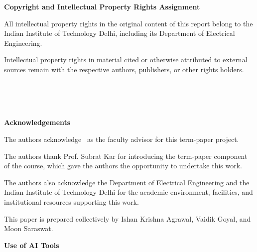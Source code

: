 \clearpage
\thispagestyle{ell305}
\vspace*{0.16\textheight}

\begin{center}
  {\Large\bfseries Copyright and Intellectual Property Rights Assignment\par}
\end{center}

\vspace{1.2cm}

All intellectual property rights in the original content of this report belong to the Indian Institute of Technology Delhi, including its Department of Electrical Engineering.

Intellectual property rights in material cited or otherwise attributed to external sources remain with the respective authors, publishers, or other rights holders.

\vfill

\begin{flushright}
  \authorone\\
  \authortwo\\
  \authorthree\\[0.5em]
  \draftdate
\end{flushright}
\clearpage
\thispagestyle{ell305}
\vspace*{0.14\textheight}

\begin{center}
  {\Large\bfseries Acknowledgements\par}
\end{center}

\vspace{1.2cm}

The authors acknowledge \facultyadvisor\ as the faculty advisor for this term-paper project.

The authors thank Prof. Subrat Kar for introducing the term-paper component of the course, which gave the authors the opportunity to undertake this work.

The authors also acknowledge the Department of Electrical Engineering and the Indian Institute of Technology Delhi for the academic environment, facilities, and institutional resources supporting this work.

This paper is prepared collectively by Ishan Krishna Agrawal, Vaidik Goyal, and Moon Saraswat.

\vspace{1.0cm}

\begin{center}
  {\large\bfseries Use of AI Tools\par}
\end{center}

